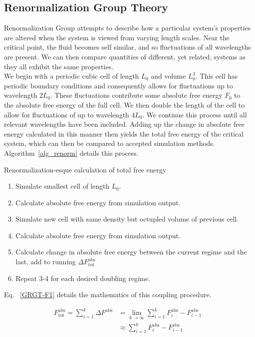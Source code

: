 \documentclass[12pt]{article}
\begin{document}
\subsection{Renormalization Group Theory}
Renormalization Group attempts to describe how a particular system's properties are altered when the system is viewed from varying length scales. Near the critical point, the fluid becomes self similar, and so fluctuations of all wavelengths are present. We can then compare quantities of different, yet related, systems as they all exhibit the same properties.\\
We begin with a periodic cubic cell of length $L_0$ and volume $L_0^3$. 
This cell has periodic boundary conditions and consequently allows for fluctuations up to wavelength $2L_0$. These fluctuations contribute some absolute free energy $F_0$ to the absolute free energy of the full cell. We then double the length of the cell to allow for fluctuations of up to wavelength $4L_0$. We continue this process until all relevant wavelengths have been included. Adding up the change in absolute free energy calculated in this manner then yields the total free energy of the critical system, which can then be compared to accepted simulation methods. Algorithm~\ref{alg_renorm} details this process. 

\begin{algorithm}[tb]
    \caption{Renormalization-esque calculation of total free energy}
    \label{alg_renorm}
    \hrulefill
    \begin{enumerate}
        \item Simulate smallest cell of length $L_0$.
        \item Calculate absolute free energy from simulation output.
        \item Simulate new cell with same density but octupled volume of previous cell.
        \item Calculate absolute free energy from simulation output.
        \item Calculate change in absolute free energy between the current regime and the last, add to running $\Delta F^{\text{abs}}_{\text{tot}}$
        \item Repeat 3-4 for each desired doubling regime.
    \end{enumerate}
    \hrulefill
\end{algorithm}

Eq. ~\ref{GRGT-F1} details the mathematics of this coupling procedure.

\begin{align}
    \label{GRGT-F1}
    F^{\text{abs}}_{\text{tot}} = \sum_{i=1}^{k}\Delta F^{\text{abs}} &= \lim_{k\to\infty}\sum_{i=1}^{k} F^{\text{abs}}_{i} - F^{\text{abs}}_{i-1}\\
    &\approx \sum_{i=1}^{k} F^{\text{abs}}_{i} - F^{\text{abs}}_{i-1}
    \label{GRGT-F2}
\end{align}
\end{document}
